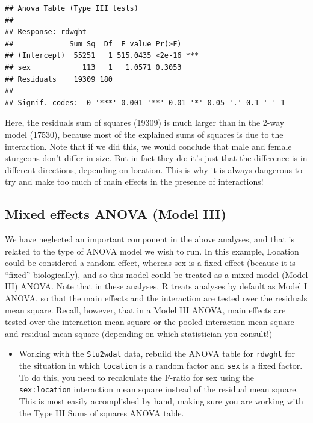 \documentclass[
  12pt,
]{book}
\providecommand{\tightlist}{%
  \setlength{\itemsep}{0pt}\setlength{\parskip}{0pt}}
\begin{document}
\begin{verbatim}
## Anova Table (Type III tests)
## 
## Response: rdwght
##             Sum Sq  Df  F value Pr(>F)    
## (Intercept)  55251   1 515.0435 <2e-16 ***
## sex            113   1   1.0571 0.3053    
## Residuals    19309 180                    
## ---
## Signif. codes:  0 '***' 0.001 '**' 0.01 '*' 0.05 '.' 0.1 ' ' 1
\end{verbatim}

Here, the residuals sum of squares (19309) is much larger than in the 2-way model (17530), because most of the explained sums of squares is due to the interaction. Note that if we did this, we would conclude that male and female sturgeons don't differ in size. But in fact they do: it's just that the difference is in different directions, depending on location. This is why it is always dangerous to try and make too much of main effects in the presence of interactions!

\hypertarget{mixed-effects-anova-model-iii}{%
\subsection{Mixed effects ANOVA (Model III)}\label{mixed-effects-anova-model-iii}}

We have neglected an important component in the above analyses, and that is related to the type of ANOVA model we wish to run. In this example, Location could be considered a random effect, whereas sex is a fixed effect (because it is ``fixed'' biologically), and so this model could be treated as a mixed model (Model III) ANOVA. Note that in these analyses, R treats analyses by default as Model I ANOVA, so that the main effects and the interaction are tested over the residuals mean square. Recall, however, that in a Model III ANOVA, main effects are tested over the interaction mean square or the pooled interaction mean square and residual mean square (depending on which statistician you consult!)

\begin{itemize}
\tightlist
\item
  Working with the \texttt{Stu2wdat} data, rebuild the ANOVA table for \texttt{rdwght}
  for the situation in which \texttt{location} is a random factor and \texttt{sex} is a
  fixed factor. To do this, you need to recalculate the F-ratio for sex using the \texttt{sex:location} interaction mean square instead of the residual mean square. This is most easily accomplished by hand, making sure you are working with the Type III Sums of squares ANOVA table.
\end{itemize}
\end{document}
